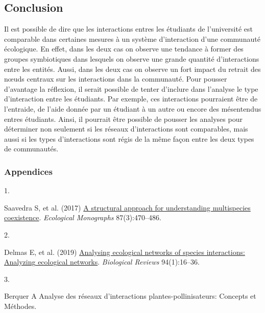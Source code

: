 \documentclass[9pt,twocolumn,twoside,]{pnas-new}
\newlength{\cslhangindent}
\newlength{\csllabelwidth}
\newlength{\cslentryspacingunit} %
\newenvironment{CSLReferences}[2] %
 {%
  \setlength{\parindent}{0pt}
  \ifodd #1
  \let\oldpar\par
  \def\par{\hangindent=\cslhangindent\oldpar}
  \fi
  \setlength{\parskip}{#2\cslentryspacingunit}
 }%
 {}
\newcommand{\CSLLeftMargin}[1]{\parbox[t]{\csllabelwidth}{#1}}
\newcommand{\CSLRightInline}[1]{\parbox[t]{\linewidth - \csllabelwidth}{#1}\break}
\begin{document}
\hypertarget{Conclusion}{%
\subsection*{Conclusion}\label{Conclusion}}

Il est possible de dire que les interactions entres les étudiants de
l'université est comparable dans certaines mesures à un système
d'interaction d'une communauté écologique. En effet, dans les deux cas
on observe une tendance à former des groupes symbiotiques dans lesquels
on observe une grande quantité d'interactions entre les entités. Aussi,
dans les deux cas on observe un fort impact du retrait des nœuds
centraux sur les interactions dans la communauté. Pour pousser
d'avantage la réflexion, il serait possible de tenter d'inclure dans
l'analyse le type d'interaction entre les étudiants. Par exemple, ces
interactions pourraient être de l'entraide, de l'aide donnée par un
étudiant à un autre ou encore des mésentendus entres étudiants. Ainsi,
il pourrait être possible de pousser les analyses pour déterminer non
seulement si les réseaux d'interactions sont comparables, mais aussi si
les types d'interactions sont régis de la même façon entre les deux
types de communautés.

\hypertarget{appendices}{%
\subsubsection*{Appendices}\label{appendices}}

\showmatmethods
\showacknow
\pnasbreak

\hypertarget{refs}{}
\begin{CSLReferences}{0}{0}
\leavevmode{}%
\CSLLeftMargin{1. }%
\CSLRightInline{Saavedra S, et al. (2017)
\href{https://doi.org/10.1002/ecm.1263}{A structural approach for
understanding multispecies coexistence}. \emph{Ecological Monographs}
87(3):470--486.}

\leavevmode{}%
\CSLLeftMargin{2. }%
\CSLRightInline{Delmas E, et al. (2019)
\href{https://doi.org/10.1111/brv.12433}{Analysing ecological networks
of species interactions: {Analyzing} ecological networks}.
\emph{Biological Reviews} 94(1):16--36.}

\leavevmode{}%
\CSLLeftMargin{3. }%
\CSLRightInline{Berquer A Analyse des réseaux d'interactions
plantes-pollinisateurs: {Concepts} et {Méthodes}.}

\end{CSLReferences}



% 
\end{document}

